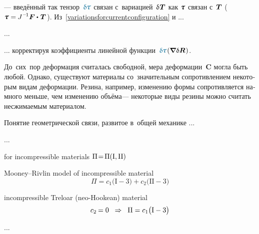 \begin{otherlanguage}{russian}
\vspace{-0.2em} \noindent --- введённый так тензор~${\varbivalent{\hspace{-0.2ex}\cauchystress}}$ связан с~вариацией~$\variation{\hspace{.1ex}\firstpiolakirchhoffstress}$ как $\cauchystress$ связан с~$\bm{T}$ (${\cauchystress = \hspace{-0.1ex} J^{\hspace{.12ex}\expminusone} \bm{F} \dotp \hspace{.16ex} \firstpiolakirchhoffstress\hspace{.2ex}}$). Из~\eqref{variationsforcurrentconfiguration} и ...

...

... корректируя коэффициенты линейной функции~${\varbivalent{\hspace{-0.2ex}\cauchystress}\hspace{.15ex}(\boldnabla \hspace{.1ex} \variation{\bm{R}}\hspace{.1ex})}$.

\end{otherlanguage}



\label{para:internalconstraints}

\begin{otherlanguage}{russian}

До~сих~пор деформация считалась свободной, мера деформации~$\bm{C}$ могла быть любой. Однако, существуют материалы со~значительным сопротивлением некоторым видам деформации. Резина, например, изменению формы сопротивляется намного меньше, чем изменению объёма\:--- некоторые виды резины можно считать несжимаемым материалом.

Понятие геометрической связи, развитое в~общей механике ...

...

for incompressible materials ${\Pi \hspace{-0.4ex} = \hspace{-0.33ex} \Pi(\mathrm{I}, \mathrm{II})}$

Mooney\hbox{--}Rivlin model of incompressible material
\[
\Pi = c_1 \bigl( \mathrm{I} - 3\bigr) + c_2 \bigl( \mathrm{II} - 3\bigr)
\]

incompressible Treloar (neo-Hookean) material
\[
c_2 \hspace{-0.16ex} = 0
\;\;\Rightarrow\;\;
\Pi = c_1 \bigl( \mathrm{I} - 3\bigr)
\]

...


\end{otherlanguage}

